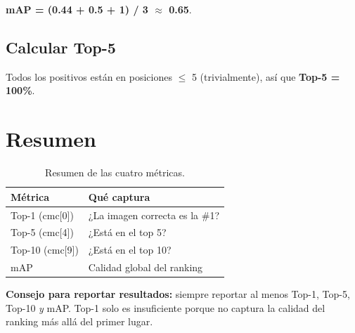 \noindent\textbf{mAP = (0.44 + 0.5 + 1) / 3 $\approx$ 0.65}.

\subsection*{Calcular Top-5}

Todos los positivos están en posiciones $\leq$ 5 (trivialmente),
así que \textbf{Top-5 = 100\%}.

\section{Resumen}

\begin{table}[H]
\centering
\caption{Resumen de las cuatro métricas.}
\label{tab:resumen-metricas}
\begin{tabular}{ll}
\toprule
\textbf{Métrica} & \textbf{Qué captura} \\
\midrule
Top-1 (cmc[0]) & ¿La imagen correcta es la \#1? \\
Top-5 (cmc[4]) & ¿Está en el top 5? \\
Top-10 (cmc[9]) & ¿Está en el top 10? \\
mAP & Calidad global del ranking \\
\bottomrule
\end{tabular}
\end{table}

\noindent\textbf{Consejo para reportar resultados:} siempre
reportar al menos Top-1, Top-5, Top-10 \emph{y} mAP. Top-1 solo
es insuficiente porque no captura la calidad del ranking más
allá del primer lugar.
